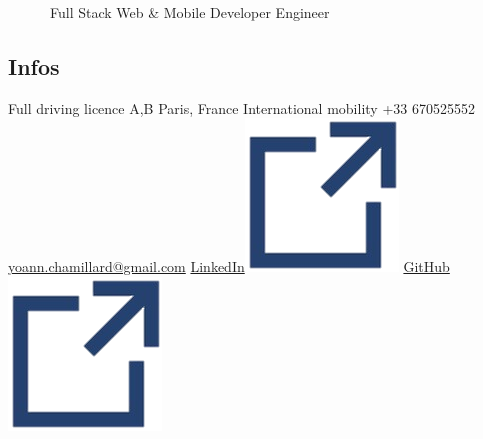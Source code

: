 \documentclass[]{friggeri-cv}
\begin{document}
      {~~~~~~Full Stack Web \& Mobile Developer Engineer}
      {}

\begin{aside}
\vspace{21mm}\section{Infos}
Full driving licence A,B\vspace{2.5mm}
Paris, France\vspace{1.5mm}
International mobility\vspace{2.5mm}
+33 670525552
\href{mailto:yoann.chamillard@gmail.com}{\small yoann.chamillard@gmail.com}\vspace{2.5mm}
\href{https://www.linkedin.com/in/yoannchamillard/?locale=en_US}{LinkedIn\hspace{1.5mm}\includegraphics[scale=0.075]{res/img/hlink.png}}
\href{https://github.com/Nokheenig?tab=stars}{GitHub\hspace{1.5mm}\includegraphics[scale=0.075]{res/img/hlink.png}}\vspace{2.5mm}
\vspace{2.5mm}

\end{aside}
\end{document}
